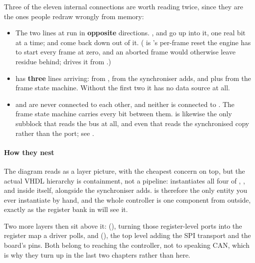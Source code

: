 Three of the eleven internal connections are worth reading twice, since they are the ones people
redraw wrongly from memory:
\begin{itemize}
  \item The two lines at  run in \textbf{opposite} directions. ,
     and  go up into it, one real bit at a time;  and 
    come back down out of it. ( is 's per-frame reset \textemdash{} the
    engine has to start every frame at zero, and an aborted frame would otherwise leave residue
    behind;  drives it from .)
  \item {} has \textbf{three} lines arriving:  from ,
     from the synchroniser  adds, and  plus
     from the frame state machine. Without the first two it has no data source at all.
  \item {} and  are never connected to each other, and neither is
    connected to . The frame state machine carries every bit between them.
     is likewise the only subblock that reads the bus at all, and even that reads
    the synchronised copy rather than the port; see .
\end{itemize}

\paragraph{How they nest}
The diagram reads as a layer picture, with the cheapest concern on top, but the actual VHDL hierarchy
is containment, not a pipeline:  instantiates all four of ,
,  and  inside itself, alongside the
 synchroniser  adds.  is therefore the only
entity you ever instantiate by hand, and the whole controller is one component from outside, exactly
as the register bank in  will see it.

Two more layers then sit above it:  (), turning those
register-level ports into the register map a driver polls, and 
(), the top level adding the SPI transport and the board's pins. Both belong to
reaching the controller, not to speaking CAN, which is why they turn up in the last two chapters
rather than here.

